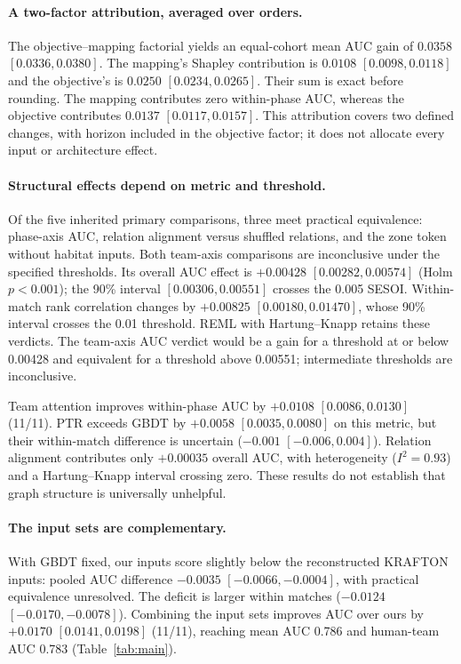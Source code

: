 \documentclass[sigconf,anonymous,nonacm]{acmart}
\begin{document}
\paragraph{A two-factor attribution, averaged over orders.}
The objective--mapping factorial yields an equal-cohort mean AUC gain of $0.0358$ $[0.0336,\allowbreak 0.0380]$. The mapping's Shapley contribution is $0.0108$ $[0.0098,\allowbreak 0.0118]$ and the objective's is $0.0250$ $[0.0234,\allowbreak 0.0265]$. Their sum is exact before rounding. The mapping contributes zero within-phase AUC, whereas the objective contributes $0.0137$ $[0.0117,\allowbreak 0.0157]$. This attribution covers two defined changes, with horizon included in the objective factor; it does not allocate every input or architecture effect.

\paragraph{Structural effects depend on metric and threshold.}
Of the five inherited primary comparisons, three meet practical equivalence: phase-axis AUC, relation alignment versus shuffled relations, and the zone token without habitat inputs. Both team-axis comparisons are inconclusive under the specified thresholds. Its overall AUC effect is $+0.00428$ $[0.00282,\allowbreak 0.00574]$ (Holm $p<0.001$); the 90\% interval $[0.00306,\allowbreak 0.00551]$ crosses the 0.005 SESOI. Within-match rank correlation changes by $+0.00825$ $[0.00180,\allowbreak 0.01470]$, whose 90\% interval crosses the 0.01 threshold. REML with Hartung--Knapp retains these verdicts. The team-axis AUC verdict would be a gain for a threshold at or below 0.00428 and equivalent for a threshold above 0.00551; intermediate thresholds are inconclusive.

Team attention improves within-phase AUC by $+0.0108$ $[0.0086,\allowbreak 0.0130]$ (11/11). PTR exceeds GBDT by $+0.0058$ $[0.0035,\allowbreak 0.0080]$ on this metric, but their within-match difference is uncertain ($-0.001$ $[-0.006,\allowbreak 0.004]$). Relation alignment contributes only $+0.00035$ overall AUC, with heterogeneity ($I^2=0.93$) and a Hartung--Knapp interval crossing zero. These results do not establish that graph structure is universally unhelpful.

\paragraph{The input sets are complementary.}
With GBDT fixed, our inputs score slightly below the reconstructed KRAFTON inputs: pooled AUC difference $-0.0035$ $[-0.0066,\allowbreak -0.0004]$, with practical equivalence unresolved. The deficit is larger within matches ($-0.0124$ $[-0.0170,\allowbreak -0.0078]$). Combining the input sets improves AUC over ours by $+0.0170$ $[0.0141,\allowbreak 0.0198]$ (11/11), reaching mean AUC 0.786 and human-team AUC 0.783 (Table~\ref{tab:main}).
\end{document}
